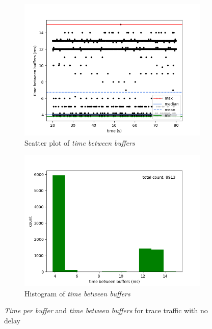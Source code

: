 \begin{figure}[H]
    \begin{subfigure}[t]{0.5\textwidth}
        \centering
        \includegraphics[scale=0.45]{img/trace_no_wait_between_buffers_scatter.png}
        \caption{Scatter plot of \textit{time between buffers}}
    \end{subfigure}%
    \begin{subfigure}[t]{0.5\textwidth}
        \centering
        \includegraphics[scale=0.45]{img/trace_no_wait_between_buffers_hist.png}
        \caption{Histogram of \textit{time between buffers}}
    \end{subfigure}

    \caption{\textit{Time per buffer} and \textit{time between buffers} for trace traffic with no delay}
    \label{evaluation/results/trace-no-delay/plots}
\end{figure}

